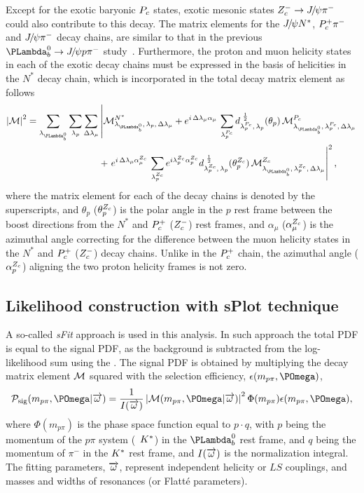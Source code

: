 Except for the exotic baryonic $P_c$ states, 
exotic mesonic states $Z_c^-\rightarrow{\ensuremath{{J\mskip -3mu/\mskip -2mu\psi}}} {\ensuremath{{\pi}^-}}$ could also contribute to this decay. 
The matrix elements for the ${{J\mskip -3mu/\mskip -2mu\psi}} N^*$, $P_c^+{{\pi}^-}$ and ${{J\mskip -3mu/\mskip -2mu\psi}}{{\pi}^-}$ decay chains, 
are similar to that in the previous $\Lb\to\jpsi\proton\pim$ study~\supercite{LHCb-PAPER-2016-015}.
Furthermore, the proton and muon helicity states in each of the exotic decay chains must be expressed in the basis of helicities in the $N^*$ decay chain, 
which is incorporated in the total decay matrix element as follows
\begin{align}
\left| \Mat \right|^2 =
\sum\limits_{\lambda_{\Lb}}
\sum\limits_{\lambda_{p}}
\sum\limits_{\Delta\lambda_{\mu}}
&\left|
\Mat_{\lambda_{\Lb},\,\lambda_p,\,\Delta\lambda_\mu}^{N^*}
+
e^{i\,{\Delta\lambda_\mu}\alpha_{\mu}}\,
\sum\limits_{\lambda_p^{\ZP}}
d^{\,\,\frac{1}{2}}_{\lambda_p^{\ZP},\,\lambda_p}(\theta_p)\,
\Mat_{\lambda_{\Lb},\,\lambda_p^{\ZP},\,\Delta\lambda_\mu}^{\ZP}  \right. \notag \\
&+ \left.
e^{i\,{\Delta\lambda_\mu}\alpha^{\ZC}_{\mu}}\,
\sum\limits_{\lambda_p^{\ZC}} e^{i\lambda_p^{\ZC}\alpha_p^{\ZC}}
d^{\,\,\frac{1}{2}}_{\lambda_p^{\ZC},\,\lambda_p}(\theta^{\ZC}_p)\,
\Mat_{\lambda_{\Lb},\,\lambda_p^{\ZC},\,\Delta\lambda_\mu}^{\ZC}
\right|^2,
\label{eq:total_matrixelement}
\end{align}
where the matrix element for each of the decay chains is denoted by the superscripts, 
and $\theta_p$ ($\theta_p^{Z_c}$) is the polar angle in the $p$ rest frame between the boost directions from the $N^*$ and $P_c^+$ ($Z_c^-$) rest frames, 
and $\alpha_\mu$ ($\alpha_\mu^{Z_c}$) is the azimuthal angle correcting for the difference between the muon helicity states 
in the $N^*$ and $P_c^+$ ($Z_c^-$) decay chains. 
Unlike in the $P_c^+$ chain, 
the azimuthal angle ($\alpha_p^{Z_c}$) aligning the two proton helicity frames is not zero.







\subsection{Likelihood construction with sPlot technique}
A so-called \emph{sFit} approach is used in this analysis.
In such approach the total PDF is equal to the signal PDF, 
as the background is subtracted from the log-likelihood sum using the \sWeights.
The signal PDF is obtained by multiplying the decay matrix element $\mathcal{M}$ squared with the selection efficiency, 
$\epsilon(m_{p\pi},\POmega)$,
\begin{equation}
\label{SUPPeq:sigpdf}
\PDF_{\rm sig}(m_{p\pi},\POmega|\Pars)
=\frac{1}{I(\Pars)}\left|\Mat(m_{p\pi},\POmega|\Pars)\right|^2
\Phi(m_{p\pi})
\epsilon(m_{p\pi},\POmega),
\end{equation}
where
$\Phi(m_{p\pi})$ is the phase space function equal to $p\cdot q$, 
with $p$ being the momentum of the $p\pi$ system (\ie\ $K^*$) in the $\Lb$ rest frame, 
and $q$ being the momentum of $\pi^-$ in the $K^*$ rest frame,
and $I(\overrightarrow{\omega})$ is the normalization integral. 
The fitting parameters, $\overrightarrow{\omega}$, represent independent helicity or $LS$ couplings,
and masses and widths of resonances (or Flatt{\'e} parameters).

